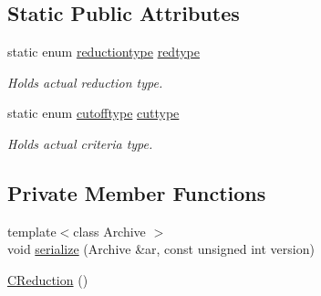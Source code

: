 \subsection*{Static Public Attributes}
\begin{DoxyCompactItemize}
\item 
static enum \hyperlink{class_go_s_u_m_1_1_c_reduction_a191434138cff8df283fa2c2e2a8e653a}{reductiontype} \hyperlink{class_go_s_u_m_1_1_c_reduction_aeaebab0853ed76b3fdc41cde083c63d9}{redtype}
\begin{DoxyCompactList}\small\item\em Holds actual reduction type. \end{DoxyCompactList}\item 
static enum \hyperlink{class_go_s_u_m_1_1_c_reduction_aa520ced4c505a26533dd1787c8055f7b}{cutofftype} \hyperlink{class_go_s_u_m_1_1_c_reduction_a46df397401c425c8eec903742e2ec6c6}{cuttype}
\begin{DoxyCompactList}\small\item\em Holds actual criteria type. \end{DoxyCompactList}\end{DoxyCompactItemize}
\subsection*{Private Member Functions}
\begin{DoxyCompactItemize}
\item 
{\footnotesize template$<$class Archive $>$ }\\void \hyperlink{class_go_s_u_m_1_1_c_reduction_a6527af01c2b8eafbba43dfdd4b14fdc0}{serialize} (Archive \&ar, const unsigned int version)
\item 
\hyperlink{class_go_s_u_m_1_1_c_reduction_abdffdc08140fc0f405a0750fc9a1fe0a}{C\-Reduction} ()
\end{DoxyCompactItemize}
